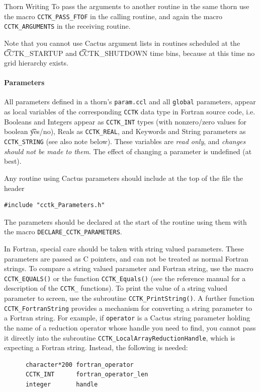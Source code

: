 \begin{cactuspart}{Thorn Writing}
To pass the arguments to another routine in the same thorn use the macro
\texttt{CCTK\_PASS\_FTOF} in the calling routine, and again the macro
\texttt{CCTK\_ARGUMENTS} in the receiving routine.

Note that you cannot use Cactus argument lists in routines scheduled at the
{\t CCTK\_STARTUP} and {\t CCTK\_SHUTDOWN} time bins, because at this time
no grid hierarchy exists.


\paragraph{Parameters}

All parameters defined in a thorn's \texttt{param.ccl} and all \texttt{global}
parameters, appear as local variables of the corresponding \texttt{CCTK} data type
in Fortran source code, i.e. Booleans and Integers appear as \texttt{CCTK\_INT}
types (with nonzero/zero values for boolean {\t yes/no}),
Reals as \texttt{CCTK\_REAL}, and Keywords and String parameters as
\texttt{CCTK\_STRING} (see
also note below). These variables are \emph{read only}, and \emph{changes should
not be made to them}. The effect of changing a parameter is undefined (at best).

Any routine using Cactus parameters should include at
the top of the file the header
\begin{verbatim}
#include "cctk_Parameters.h"
\end{verbatim}

The parameters should be declared at the start of the routine
using them with the macro \texttt{DECLARE\_CCTK\_PARAMETERS}.

In Fortran, special care should be taken with string valued parameters.
These parameters are passed as C pointers, and can not be treated as
normal Fortran strings.
To compare a string valued parameter and Fortran
string, use the macro \texttt{CCTK\_EQUALS()} or the function \texttt{CCTK\_Equals()}
(see the reference manual for a description of the \texttt{CCTK\_} functions).
To print the value of a string valued parameter to screen, use the subroutine
\texttt{CCTK\_PrintString()}. A further function \texttt{CCTK\_FortranString}
provides a mechanism for converting a string parameter to a Fortran string.
For example, if \texttt{operator} is a Cactus string parameter holding the name of a reduction operator whose handle you need to find, you cannot pass it
directly into the subroutine \texttt{CCTK\_LocalArrayReductionHandle}, which is expecting
a Fortran string. Instead, the following is needed:
%
\begin{verbatim}
      character*200 fortran_operator
      CCTK_INT      fortran_operator_len
      integer       handle


\end{verbatim}
\end{cactuspart}
